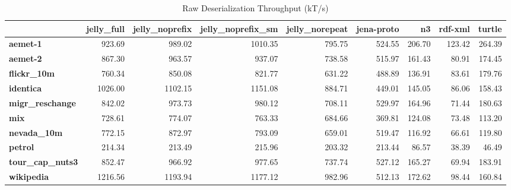 \begin{table}[h!]
\small
\centering
\caption{Raw Deserialization Throughput (kT/s)}
\begin{tabular}{lrrrrrrrr}
\toprule
{} &  jelly\_full &  jelly\_noprefix &  jelly\_noprefix\_sm &  jelly\_norepeat &  jena-proto &     n3 &  rdf-xml &  turtle \\
\midrule
\textbf{aemet-1       } &      923.69 &          989.02 &            1010.35 &          795.75 &      524.55 & 206.70 &   123.42 &  264.39 \\
\textbf{aemet-2       } &      867.30 &          963.57 &             937.07 &          738.58 &      515.97 & 161.43 &    80.91 &  174.45 \\
\textbf{flickr\_10m    } &      760.34 &          850.08 &             821.77 &          631.22 &      488.89 & 136.91 &    83.61 &  179.76 \\
\textbf{identica      } &     1026.00 &         1102.15 &            1151.08 &          884.71 &      449.01 & 145.05 &    86.06 &  158.43 \\
\textbf{migr\_reschange} &      842.02 &          973.73 &             980.12 &          708.11 &      529.97 & 164.96 &    71.44 &  180.63 \\
\textbf{mix           } &      728.61 &          774.07 &             763.33 &          684.66 &      369.81 & 124.08 &    73.48 &  113.20 \\
\textbf{nevada\_10m    } &      772.15 &          872.97 &             793.09 &          659.01 &      519.47 & 116.92 &    66.61 &  119.80 \\
\textbf{petrol        } &      214.34 &          213.49 &             215.96 &          203.32 &      213.44 &  86.57 &    38.39 &   46.49 \\
\textbf{tour\_cap\_nuts3} &      852.47 &          966.92 &             977.65 &          737.74 &      527.12 & 165.27 &    69.94 &  183.91 \\
\textbf{wikipedia     } &     1216.56 &         1193.94 &            1177.12 &          982.96 &      512.13 & 172.62 &    98.44 &  160.84 \\
\bottomrule
\end{tabular}
\end{table}
